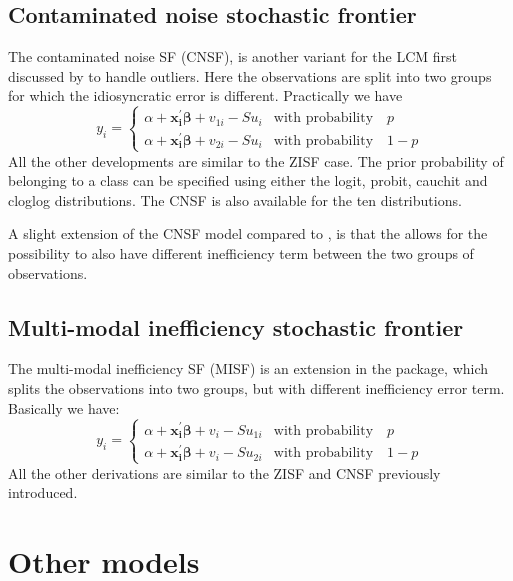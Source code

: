 \documentclass[nojss]{jss}
\begin{document}
\subsection{Contaminated noise stochastic frontier}

The contaminated noise SF (CNSF), is another variant for the LCM first discussed 
by \citet{wheat19} to handle outliers. Here the observations are split into 
two groups for which the idiosyncratic error is different. Practically we have
%
\begin{equation}\label{eq:2.3.1}
y_i = \begin{cases}
\alpha + \mathbf{x_i^{\prime}}\bm{\beta} + 
 v_{1i} - Su_i & \text{with probability} \quad p \\
 \alpha + \mathbf{x_i^{\prime}}\bm{\beta} + 
v_{2i} - Su_i & \text{with probability} \quad 1-p
\end{cases}
\end{equation}
%
All the other developments are similar to the ZISF case. The prior probability
of belonging to a class can be specified using either the logit, probit, cauchit
and cloglog distributions. The CNSF is also available for the ten distributions.

A slight extension of the CNSF model compared to \citet{wheat19}, is that the 
 allows for the possibility to also have different inefficiency term 
between the two groups of observations.

\subsection{Multi-modal inefficiency stochastic frontier}

The multi-modal inefficiency SF (MISF) is an extension in the  package, 
which splits the observations into two groups, but with different inefficiency
error term. Basically we have:
%
\begin{equation}\label{eq:2.4.1}
y_i = \begin{cases}
\alpha + \mathbf{x_i^{\prime}}\bm{\beta} + 
 v_{i} - Su_{1i} & \text{with probability} \quad p \\
 \alpha + \mathbf{x_i^{\prime}}\bm{\beta} + 
v_{i} - Su_{2i} & \text{with probability} \quad 1-p
\end{cases}
\end{equation}
%
All the other derivations are similar to the ZISF and CNSF previously introduced.

\section{Other models} \label{sec:other}
\end{document}
